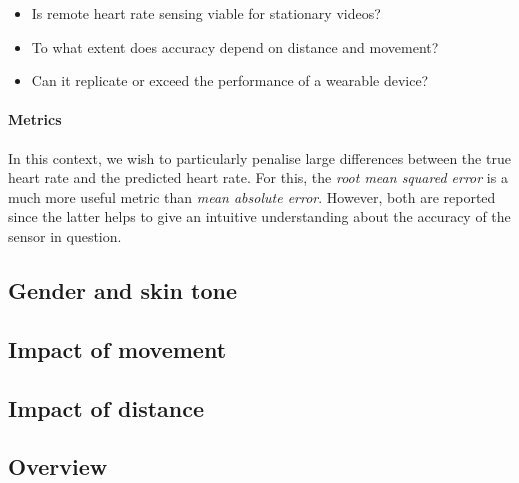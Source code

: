 % 
\begin{itemize}
    \item Is remote heart rate sensing viable for stationary videos?
    \item To what extent does accuracy depend on distance and movement?
    \item Can it replicate or exceed the performance of a wearable device?
\end{itemize}

\paragraph{Metrics}
In this context, we wish to particularly penalise large differences between the true heart rate and the predicted heart rate. For this, 
the \textit{root mean squared error} is a much more useful metric than \textit{mean absolute error}. However, both are reported since the latter helps
to give an intuitive understanding about the accuracy of the sensor in question.

\subsection{Gender and skin tone}
\subsection{Impact of movement}
\subsection{Impact of distance}
\subsection{Overview}



